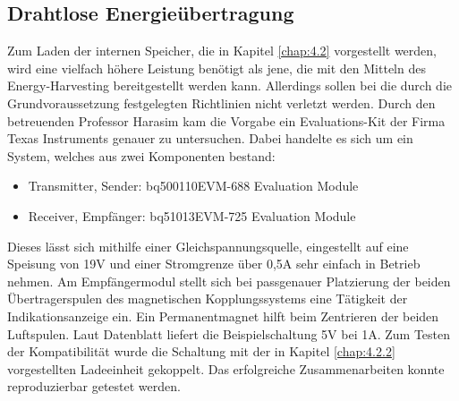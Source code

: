 \documentclass[12pt]{scrreprt} %
\begin{document}
\subsection{Drahtlose Energieübertragung}
\label{chap:4.1.2}
Zum Laden der internen Speicher, die in Kapitel \vref{chap:4.2} vorgestellt werden, wird eine vielfach höhere Leistung benötigt als jene, die mit den Mitteln des Energy-Harvesting bereitgestellt werden kann. Allerdings sollen bei die durch die Grundvoraussetzung festgelegten Richtlinien nicht verletzt werden. Durch den betreuenden Professor Harasim kam die Vorgabe ein Evaluations-Kit der Firma Texas Instruments genauer zu untersuchen. Dabei handelte es sich um ein System, welches aus zwei Komponenten bestand:
\begin{itemize}
\item
Transmitter, Sender: bq500110EVM-688 Evaluation Module
\item
Receiver, Empfänger: bq51013EVM-725 Evaluation Module
\end{itemize}
Dieses lässt sich mithilfe einer Gleichspannungsquelle, eingestellt auf eine Speisung von 19V und einer Stromgrenze über 0,5A sehr einfach in Betrieb nehmen. Am Empfängermodul stellt sich bei passgenauer Platzierung der beiden Übertragerspulen des magnetischen Kopplungssystems eine Tätigkeit der Indikationsanzeige ein. Ein Permanentmagnet hilft beim Zentrieren der beiden Luftspulen. Laut Datenblatt \citep[vgl. S.2]{bq51013EVM-725} liefert die Beispielschaltung 5V bei 1A. Zum Testen der Kompatibilität wurde die Schaltung mit der in Kapitel \ref{chap:4.2.2} vorgestellten Ladeeinheit gekoppelt. Das erfolgreiche Zusammenarbeiten konnte reproduzierbar getestet werden.\\
\end{document}
